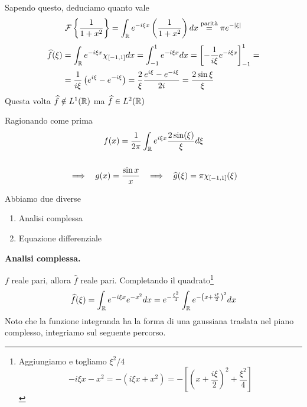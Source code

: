 Sapendo questo, deduciamo quanto vale
\begin{equation*}
\mathcal{F} \left\{\frac{1}{1+x^{2}}\right\} =\int _{\mathbb{R} } e^{-i\xi x}\left(\frac{1}{1+x^{2}}\right) dx\overset{\text{parità}}{=} \pi e^{-| \xi | }
\end{equation*}
\Soluzione
\begin{equation*}
\begin{aligned}
\widehat{f} (\xi ) & =\int _{\mathbb{R} } e^{-i\xi x} \chi _{[-1,1]} dx=\int ^{1}_{-1} e^{-i\xi x} dx=\left[ -\frac{1}{i\xi } e^{-i\xi x}\right]^{1}_{-1} =\\
 & =\frac{1}{i\xi }\left( e^{i\xi } -e^{-i\xi }\right) =\frac{2}{\xi }\frac{e^{i\xi } -e^{-i\xi }}{2i} =\frac{2\sin \xi }{\xi }
\end{aligned}
\end{equation*}
Questa volta $\widehat{f} \notin L^{1} (\mathbb{R}  )$ ma $\widehat{f} \in L^{2} (\mathbb{R}  )$

Ragionando come prima
\begin{gather*}
f(x)=\frac{1}{2\pi }\int _{\mathbb{R} } e^{i\xi x}\frac{2\sin( \xi )}{\xi } d\xi \\
\\
\implies \ \ g( x) =\frac{\sin x}{x} \ \ \implies \ \ \widehat{g}( \xi ) =\pi \chi _{[-1,1]} (\xi )
\end{gather*}
\Soluzione

Abbiamo due diverse
\begin{enumerate}
\item Analisi complessa
\item Equazione differenziale
\end{enumerate}

\textbf{Analisi complessa.}

$f$ reale pari, allora $\hat{f}$ reale pari. Completando il quadrato\footnote{Aggiungiamo e togliamo $\xi ^{2} /4$
\begin{equation*}
-i\xi x-x^{2} =-\left( i\xi x+x^{2}\right) =-\left[\left( x+\frac{i\xi }{2}\right)^{2} +\frac{\xi ^{2}}{4}\right]
\end{equation*}
}
\begin{equation*}
\widehat{f} (\xi )=\int _{\mathbb{R} } e^{-i\xi x} e^{-x^{2}} dx=e^{-\frac{\xi ^{2}}{4}}\int _{\mathbb{R} } e^{-\left( x+\frac{i\xi }{2}\right)^{2}} dx
\end{equation*}
Noto che la funzione integranda ha la forma di una gaussiana traslata nel piano complesso, integriamo sul seguente percorso.



